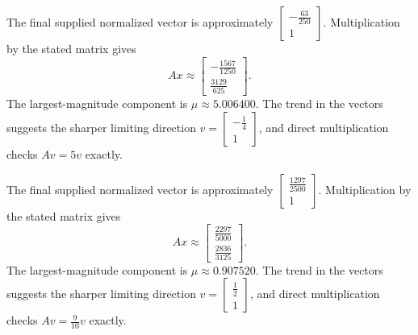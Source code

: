 The final supplied normalized vector is approximately $\left[\begin{matrix}- \frac{63}{250}\\1\end{matrix}\right]$.
Multiplication by the stated matrix gives
\[Ax\approx\left[\begin{matrix}- \frac{1567}{1250}\\\frac{3129}{625}\end{matrix}\right].\]
The largest-magnitude component is $\mu\approx5.006400$.
The trend in the vectors suggests the sharper limiting direction
$v=\left[\begin{matrix}- \frac{1}{4}\\1\end{matrix}\right]$, and direct multiplication checks
$Av=5v$ exactly.

The final supplied normalized vector is approximately $\left[\begin{matrix}\frac{1297}{2500}\\1\end{matrix}\right]$.
Multiplication by the stated matrix gives
\[Ax\approx\left[\begin{matrix}\frac{2297}{5000}\\\frac{2836}{3125}\end{matrix}\right].\]
The largest-magnitude component is $\mu\approx0.907520$.
The trend in the vectors suggests the sharper limiting direction
$v=\left[\begin{matrix}\frac{1}{2}\\1\end{matrix}\right]$, and direct multiplication checks
$Av=\frac{9}{10}v$ exactly.

